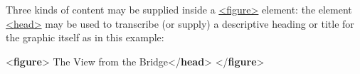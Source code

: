 Three kinds of content may be supplied inside a \hyperref[TEI.figure]{<figure>} element: the element \hyperref[TEI.head]{<head>} may be used to transcribe (or supply) a descriptive heading or title for the graphic itself as in this example: \par\bgroup{}\exampleFont \begin{shaded}\noindent\mbox{}{<\textbf{figure}>}\mbox{}\newline 
{}\mbox{}\newline 
{}The View from the Bridge{</\textbf{head}>}\mbox{}\newline 
{</\textbf{figure}>}\end{shaded}\egroup\par \par
